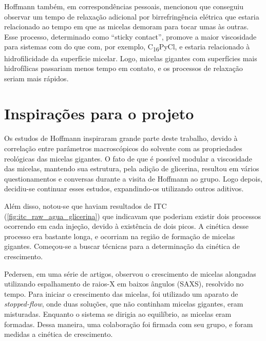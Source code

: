 		
		Hoffmann também, em correspondências pessoais, mencionou que conseguiu observar um tempo de relaxação adicional por birrefringência elétrica\cite{Hoffmann1990} que estaria relacionado ao tempo em que as micelas demoram para tocar umas às outras. Esse processo, determinado como ``sticky contact''\cite{Hoffmann2010, Hoffmann2012a, Yamashita2006}, promove a maior viscosidade para sistemas com \CTAB{} do que com, por exemplo, C\textsubscript{16}PyCl, e estaria relacionado à hidrofilicidade da superfície micelar. Logo, micelas gigantes com superfícies mais hidrofílicas passariam menos tempo em contato, e os processos de relaxação seriam mais rápidos. 
		


		\chapter{Inspirações para o projeto} 

		Os estudos de Hoffmann inspiraram grande parte deste trabalho, devido à correlação entre parâmetros macroscópicos do solvente com as propriedades reológicas das micelas gigantes. O fato de que é possível modular a viscosidade das micelas, mantendo sua estrutura, pela adição de glicerina, resultou em vários questionamentos e conversas durante a visita de Hoffmann ao grupo. Logo depois, decidiu-se continuar esses estudos, expandindo-os utilizando outros aditivos.
		
		Além disso, notou-se que haviam resultados de ITC (\autoref{fig:itc_raw_agua_glicerina}) que indicavam que poderiam existir dois processos ocorrendo em cada injeção, devido à existência de dois picos. A cinética desse processo era bastante longa, e ocorriam na região de formação de micelas gigantes. Começou-se a buscar técnicas para a determinação da cinética de crescimento.
		
		Pedersen, em uma série de artigos\cite{Jensen2013a, Jensen2014a, Jensen2016a}, observou o crescimento de micelas alongadas utilizando espalhamento de raios-X em baixos ângulos (SAXS), resolvido no tempo. Para iniciar o crescimento das micelas, foi utilizado um aparato de \emph{stopped-flow}, onde duas soluções, que não continham micelas gigantes, eram misturadas. Enquanto o sistema se dirigia ao equilíbrio, as micelas eram formadas. Dessa maneira, uma colaboração foi firmada com seu grupo, e foram medidas a cinética de crescimento.  
		
